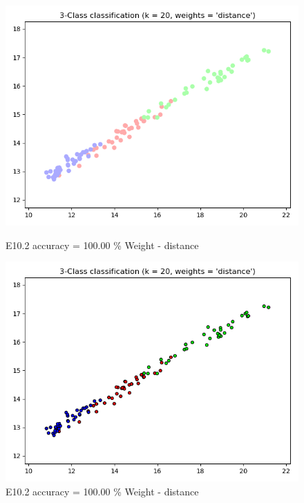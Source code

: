 \documentclass{classrep}
\begin{document}
\begin{figure}[H]
\begin{minipage}{0.5\linewidth}
				\includegraphics[scale=0.25]{KNN_seed_10_7.png}
				\caption{E10.2 accuracy = 100.00 \% Weight - distance}
				\label{E10.2}
			\end{minipage}
			\begin{minipage}{0.5\linewidth}
				\centering
				\includegraphics[scale=0.25]{KNN_seed_10_8.png}
				\caption{E10.2 accuracy = 100.00 \% Weight - distance}
				\label{E10.2}
			\end{minipage}
			\begin{minipage}{0.5\linewidth}
				\centering

\end{minipage}
\end{figure}
\end{document}
